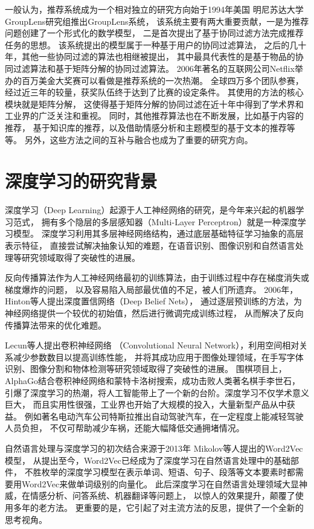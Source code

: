 一般认为，推荐系统成为一个相对独立的研究方向始于1994年美国
明尼苏达大学GroupLens研究组推出GroupLens系统\parencite{resnick1994grouplens}，
该系统主要有两大重要贡献，一是为推荐问题创建了一个形式化的数学模型，
二是首次提出了基于协同过滤方法完成推荐任务的思想。
该系统提出的模型属于一种基于用户的协同过滤算法，
之后的几十年，其他一些协同过滤的算法也相继被提出，
其中最具代表性的是基于物品的协同过滤算法和基于矩阵分解的协同过滤算法。
2006年著名的互联网公司Netflix举办的百万美金大奖赛可以看做是推荐系统的一次热潮。
全球四万多个团队参赛，经过近三年的较量，获奖队伍终于达到了比赛的设定条件。
其使用的方法的核心模块就是矩阵分解，
这使得基于矩阵分解的协同过滤在近十年中得到了学术界和工业界的广泛关注和重视。
同时，其他推荐算法也在不断发展，比如基于内容的推荐，
基于知识库的推荐，以及借助情感分析和主题模型的基于文本的推荐等等。
另外，这些方法之间的互补与融合也成为了重要的研究方向。

\section{深度学习的研究背景}
深度学习（Deep Learning）起源于人工神经网络的研究，是今年来兴起的机器学习范式，
拥有多个隐层的多层感知器（Multi-Layer Perceptron）就是一种深度学习模型。
深度学习利用其多层神经网络结构，通过底层基础特征学习抽象的高层表示特征，
直接尝试解决抽象认知的难题，在语音识别、图像识别和自然语言处理等研究领域取得了突破性的进展。

反向传播算法作为人工神经网络最初的训练算法，由于训练过程中存在梯度消失或梯度爆炸的问题，
以及容易陷入局部最优值的不足，被人们所遗弃。
2006年，Hinton等人\parencite{hinton2006fast}提出深度置信网络（Deep Belief Nets），
通过逐层预训练的方法，为神经网络提供一个较优的初始值，然后进行微调完成训练过程，
从而解决了反向传播算法带来的优化难题。

Lecun等人\parencite{lecun1989backpropagation}提出卷积神经网络
（Convolutional Neural Network），利用空间相对关系减少参数数目以提高训练性能，
并将其成功应用于图像处理领域，在手写字体识别、图像分割和物体检测等研究领域取得了突破性的进展。
围棋项目上，AlphaGo结合卷积神经网络和蒙特卡洛树搜索，成功击败人类著名棋手李世石，
引爆了深度学习的热潮，将人工智能带上了一个新的台阶。深度学习不仅学术意义巨大，
而且实用性很强，工业界也开始了大规模的投入，大量新型产品从中获益。
例如著名电动汽车公司特斯拉推出自动驾驶汽车，在一定程度上能减轻驾驶人员负担，
不仅可帮助减少车祸，还能大幅降低交通拥堵情况。

自然语言处理与深度学习的初次结合来源于2013年
Mikolov等人\parencite{mikolov2013efficient}提出的Word2Vec模型，
从提出至今，Word2Vec已经成为了深度学习在自然语言处理中的基础部件，
不胜枚举的深度学习模型在表示单词、短语、句子、段落等文本要素时都需要用Word2Vec来做单词级别的向量化。
此后深度学习在自然语言处理领域大显神威，在情感分析、问答系统、机器翻译等问题上，
以惊人的效果提升，颠覆了使用多年的老方法。
更重要的是，它引起了对主流方法的反思，提供了一个全新的思考视角。

